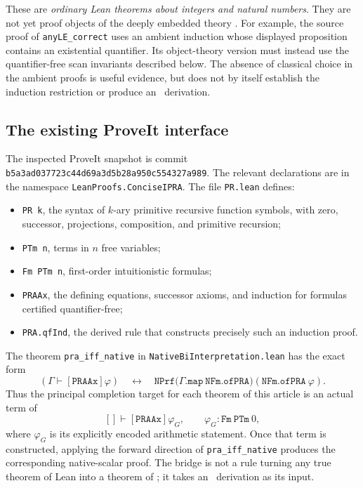 These are \emph{ordinary Lean theorems about integers and natural numbers}.
They are not yet proof objects of the deeply embedded theory \iPRA.
For example, the source proof of \texttt{anyLE\_correct} uses an ambient
induction whose displayed proposition contains an existential quantifier.
Its object-theory version must instead use the quantifier-free scan
invariants described below.  The absence of classical choice in the
ambient proofs is useful evidence, but does not by itself establish the
induction restriction or produce an \iPRA\ derivation.

\subsection{The existing ProveIt interface}

The inspected ProveIt snapshot is commit
\texttt{b5a3ad037723c44d69a3d5b28a950c554327a989}.
The relevant declarations are in the namespace
\texttt{LeanProofs.ConciseIPRA}.  The file \texttt{PR.lean} defines:
\begin{itemize}
\item \texttt{PR k}, the syntax of $k$-ary primitive recursive function
  symbols, with zero, successor, projections, composition, and primitive
  recursion;
\item \texttt{PTm n}, terms in $n$ free variables;
\item \texttt{Fm PTm n}, first-order intuitionistic formulas;
\item \texttt{PRAAx}, the defining equations, successor axioms, and
  induction for formulas certified quantifier-free;
\item \texttt{PRA.qfInd}, the derived rule that constructs precisely such
  an induction proof.
\end{itemize}
The theorem \texttt{pra\_iff\_native} in
\texttt{NativeBiInterpretation.lean} has the exact form
\[
 (\Gamma\vdash[\mathtt{PRAAx}]\varphi)
 \quad\longleftrightarrow\quad
 \mathtt{NPrf}\bigl(\Gamma.\mathtt{map}\ \mathtt{NFm.ofPRA}\bigr)
                     (\mathtt{NFm.ofPRA}\ \varphi).
\]
Thus the principal completion target for each theorem of this article is
an actual term of
\[
 []\vdash[\mathtt{PRAAx}]\varphi_G,
 \qquad \varphi_G:\mathtt{Fm}\ \mathtt{PTm}\ 0,
\]
where $\varphi_G$ is its explicitly encoded arithmetic statement.
Once that term is constructed, applying the forward direction of
\texttt{pra\_iff\_native} produces the corresponding native-scalar proof.
The bridge is not a rule turning any true theorem of Lean into a theorem
of \iPRA; it takes an \iPRA\ derivation as its input.

